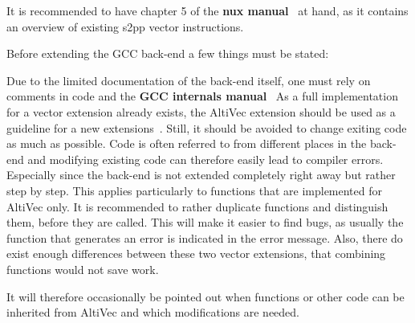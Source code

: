 It is recommended to have chapter 5 of the \textbf{nux manual}~\citep[ch.~5]{nuxmanual} at hand, as it contains an overview of existing \ac{s2pp} vector instructions.

Before extending the \ac{GCC} back-end a few things must be stated:

Due to the limited documentation of the back-end itself, one must rely on comments in code and the \textbf{\ac{GCC} internals manual}~\citep{GCCint} 
As a full implementation for a vector extension already exists, the AltiVec extension should be used as a guideline for a new extensions~\cite{AltiVec}. 
Still, it should be avoided to change exiting code as much as possible.
Code is often referred to from different places in the back-end and modifying existing code can therefore easily lead to compiler errors.
Especially since the back-end is not extended completely right away but rather step by step.
This applies particularly to functions that are implemented for AltiVec only.
It is recommended to rather duplicate functions and distinguish them, before they are called.
This will make it easier to find bugs, as usually the function that generates an error is indicated in the error message.
Also, there do exist enough differences between these two vector extensions, that combining functions would not save work.

It will therefore occasionally be pointed out when functions or other code can be inherited from AltiVec and which modifications are needed.

